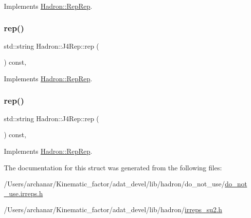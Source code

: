 Implements \mbox{\hyperlink{structHadron_1_1RepRep_ab3213025f6de249f7095892109575fde}{Hadron\+::\+Rep\+Rep}}.

\mbox{\label{structHadron_1_1J4Rep_a2dcdb2a04a0f8207e99fffb770037b9e}} 
\subsubsection{\texorpdfstring{rep()}{rep()}\hspace{0.1cm}{\footnotesize\ttfamily [2/3]}}
{\footnotesize\ttfamily std\+::string Hadron\+::\+J4\+Rep\+::rep (\begin{DoxyParamCaption}{ }\end{DoxyParamCaption}) const\hspace{0.3cm}{\ttfamily [inline]}, {\ttfamily [virtual]}}



Implements \mbox{\hyperlink{structHadron_1_1RepRep_ab3213025f6de249f7095892109575fde}{Hadron\+::\+Rep\+Rep}}.

\mbox{\label{structHadron_1_1J4Rep_a2dcdb2a04a0f8207e99fffb770037b9e}} 
\subsubsection{\texorpdfstring{rep()}{rep()}\hspace{0.1cm}{\footnotesize\ttfamily [3/3]}}
{\footnotesize\ttfamily std\+::string Hadron\+::\+J4\+Rep\+::rep (\begin{DoxyParamCaption}{ }\end{DoxyParamCaption}) const\hspace{0.3cm}{\ttfamily [inline]}, {\ttfamily [virtual]}}



Implements \mbox{\hyperlink{structHadron_1_1RepRep_ab3213025f6de249f7095892109575fde}{Hadron\+::\+Rep\+Rep}}.



The documentation for this struct was generated from the following files\+:\begin{DoxyCompactItemize}
\item 
/\+Users/archanar/\+Kinematic\+\_\+factor/adat\+\_\+devel/lib/hadron/do\+\_\+not\+\_\+use/\mbox{\hyperlink{do__not__use_8irreps_8h}{do\+\_\+not\+\_\+use.\+irreps.\+h}}\item 
/\+Users/archanar/\+Kinematic\+\_\+factor/adat\+\_\+devel/lib/hadron/\mbox{\hyperlink{lib_2hadron_2irreps__su2_8h}{irreps\+\_\+su2.\+h}}\end{DoxyCompactItemize}
